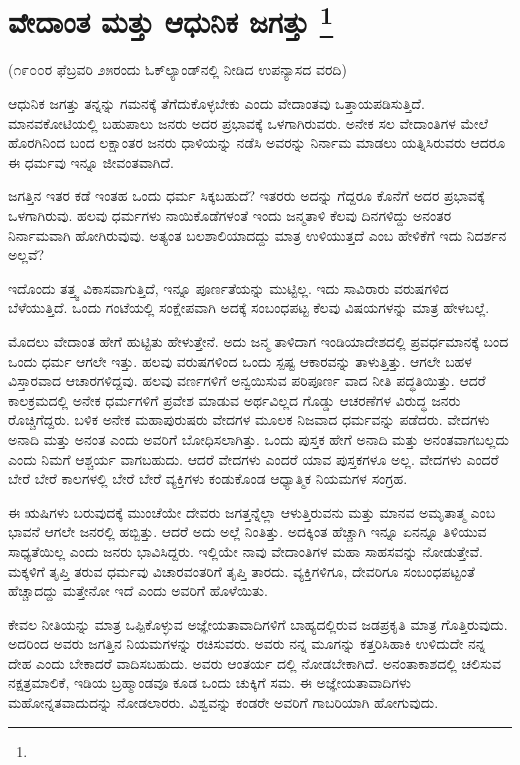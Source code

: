 
\chapter[ವೇದಾಂತ ಮತ್ತು ಆಧುನಿಕ ಜಗತ್ತು ]{ವೇದಾಂತ ಮತ್ತು ಆಧುನಿಕ ಜಗತ್ತು \protect\footnote{}}

\centerline{(೧೯೦೦ರ ಫೆಬ್ರವರಿ ೨೫ರಂದು ಓಕ್​ಲ್ಯಾಂಡ್​ನಲ್ಲಿ ನೀಡಿದ ಉಪನ್ಯಾಸದ ವರದಿ)}

ಆಧುನಿಕ ಜಗತ್ತು ತನ್ನನ್ನು ಗಮನಕ್ಕೆ ತೆಗೆದುಕೊಳ್ಳಬೇಕು ಎಂದು ವೇದಾಂತವು ಒತ್ತಾಯಪಡಿಸುತ್ತಿದೆ. ಮಾನವಕೋಟಿಯಲ್ಲಿ ಬಹುಪಾಲು ಜನರು ಅದರ ಪ್ರಭಾವಕ್ಕೆ ಒಳಗಾಗಿರುವರು. ಅನೇಕ ಸಲ ವೇದಾಂತಿಗಳ ಮೇಲೆ ಹೊರಗಿನಿಂದ ಬಂದ ಲಕ್ಷಾಂತರ ಜನರು ಧಾಳಿಯನ್ನು ನಡೆಸಿ ಅವರನ್ನು ನಿರ್ನಾಮ ಮಾಡಲು ಯತ್ನಿಸಿರುವರು ಆದರೂ ಈ ಧರ್ಮವು ಇನ್ನೂ ಜೀವಂತವಾಗಿದೆ.

ಜಗತ್ತಿನ ಇತರ ಕಡೆ ಇಂತಹ ಒಂದು ಧರ್ಮ ಸಿಕ್ಕಬಹುದೆ? ಇತರರು ಅದನ್ನು ಗೆದ್ದರೂ ಕೊನೆಗೆ ಅದರ ಪ್ರಭಾವಕ್ಕೆ ಒಳಗಾಗಿರುವು. ಹಲವು ಧರ್ಮಗಳು ನಾಯಿಕೊಡೆಗಳಂತೆ ಇಂದು ಜನ್ಮತಾಳಿ ಕೆಲವು ದಿನಗಳಿದ್ದು ಅನಂತರ ನಿರ್ನಾಮವಾಗಿ ಹೋಗಿರುವುವು. ಅತ್ಯಂತ ಬಲಶಾಲಿಯಾದದ್ದು ಮಾತ್ರ ಉಳಿಯುತ್ತದೆ ಎಂಬ ಹೇಳಿಕೆಗೆ ಇದು ನಿದರ್ಶನ ಅಲ್ಲವೆ?

ಇದೊಂದು ತತ್ತ್ವ ವಿಕಾಸವಾಗುತ್ತಿದೆ, ಇನ್ನೂ ಪೂರ್ಣತೆಯನ್ನು ಮುಟ್ಟಿಲ್ಲ. ಇದು ಸಾವಿರಾರು ವರುಷಗಳಿದ ಬೆಳೆಯುತ್ತಿದೆ. ಒಂದು ಗಂಟೆಯಲ್ಲಿ ಸಂಕ್ಷೇಪವಾಗಿ ಅದಕ್ಕೆ ಸಂಬಂಧಪಟ್ಟ ಕೆಲವು ವಿಷಯಗಳನ್ನು ಮಾತ್ರ ಹೇಳಬಲ್ಲೆ.

ಮೊದಲು ವೇದಾಂತ ಹೇಗೆ ಹುಟ್ಟಿತು ಹೇಳುತ್ತೇನೆ. ಅದು ಜನ್ಮ ತಾಳಿದಾಗ ಇಂಡಿಯಾದೇಶದಲ್ಲಿ ಪ್ರವರ್ಧಮಾನಕ್ಕೆ ಬಂದ ಒಂದು ಧರ್ಮ ಆಗಲೇ ಇತ್ತು. ಹಲವು ವರುಷಗಳಿಂದ ಒಂದು ಸ್ಪಷ್ಟ ಆಕಾರವನ್ನು ತಾಳುತ್ತಿತ್ತು. ಆಗಲೇ ಬಹಳ ವಿಸ್ತಾರವಾದ ಆಚಾರಗಳಿದ್ದವು. ಹಲವು ವರ್ಣಗಳಿಗೆ ಅನ್ವಯಿಸುವ ಪರಿಪೂರ್ಣ ವಾದ ನೀತಿ ಪದ್ಧತಿಯಿತ್ತು. ಆದರೆ ಕಾಲಕ್ರಮದಲ್ಲಿ ಅನೇಕ ಧರ್ಮಗಳಿಗೆ ಪ್ರವೇಶ ಮಾಡುವ ಅರ್ಥವಿಲ್ಲದ ಗೊಡ್ಡು ಆಚರಣೆಗಳ ವಿರುದ್ಧ ಜನರು ರೊಚ್ಚಿಗೆದ್ದರು. ಬಳಿಕ ಅನೇಕ ಮಹಾಪುರುಷರು ವೇದಗಳ ಮೂಲಕ ನಿಜವಾದ ಧರ್ಮವನ್ನು ಪಡೆದರು. ವೇದಗಳು ಅನಾದಿ ಮತ್ತು ಅನಂತ ಎಂದು ಅವರಿಗೆ ಬೋಧಿಸಲಾಗಿತ್ತು. ಒಂದು ಪುಸ್ತಕ ಹೇಗೆ ಅನಾದಿ ಮತ್ತು ಅನಂತವಾಗಬಲ್ಲದು ಎಂದು ನಿಮಗೆ ಆಶ್ಚರ್ಯ ವಾಗಬಹುದು. ಆದರೆ ವೇದಗಳು ಎಂದರೆ ಯಾವ ಪುಸ್ತಕಗಳೂ ಅಲ್ಲ. ವೇದಗಳು ಎಂದರೆ ಬೇರೆ ಬೇರೆ ಕಾಲಗಳಲ್ಲಿ ಬೇರೆ ಬೇರೆ ವ್ಯಕ್ತಿಗಳು ಕಂಡುಕೊಂಡ ಆಧ್ಯಾತ್ಮಿಕ ನಿಯಮಗಳ ಸಂಗ್ರಹ.

ಈ ಋಷಿಗಳು ಬರುವುದಕ್ಕೆ ಮುಂಚೆಯೇ ದೇವರು ಜಗತ್ತನ್ನೆಲ್ಲಾ ಆಳುತ್ತಿರುವನು ಮತ್ತು ಮಾನವ ಅಮೃತಾತ್ಮ ಎಂಬ ಭಾವನೆ ಆಗಲೇ ಜನರಲ್ಲಿ ಹಬ್ಬಿತ್ತು. ಆದರೆ ಅದು ಅಲ್ಲೆ ನಿಂತಿತ್ತು. ಅದಕ್ಕಿಂತ ಹೆಚ್ಚಾಗಿ ಇನ್ನೂ ಏನನ್ನೂ ತಿಳಿಯುವ ಸಾಧ್ಯತೆಯಿಲ್ಲ ಎಂದು ಜನರು ಭಾವಿಸಿದ್ದರು. ಇಲ್ಲಿಯೇ ನಾವು ವೇದಾಂತಿಗಳ ಮಹಾ ಸಾಹಸವನ್ನು ನೋಡುತ್ತೇವೆ. ಮಕ್ಕಳಿಗೆ ತೃಪ್ತಿ ತರುವ ಧರ್ಮವು ವಿಚಾರವಂತರಿಗೆ ತೃಪ್ತಿ ತಾರದು. ವ್ಯಕ್ತಿಗಳಿಗೂ, ದೇವರಿಗೂ ಸಂಬಂಧಪಟ್ಟಂತೆ ಹೆಚ್ಚಾದದ್ದು ಮತ್ತೇನೋ ಇದೆ ಎಂದು ಅವರಿಗೆ ಹೊಳೆಯಿತು.

ಕೇವಲ ನೀತಿಯನ್ನು ಮಾತ್ರ ಒಪ್ಪಿಕೊಳ್ಳುವ ಅಜ್ಞೇಯತಾವಾದಿಗಳಿಗೆ ಬಾಹ್ಯದಲ್ಲಿರುವ ಜಡಪ್ರಕೃತಿ ಮಾತ್ರ ಗೊತ್ತಿರುವುದು. ಅದರಿಂದ ಅವರು ಜಗತ್ತಿನ ನಿಯಮಗಳನ್ನು ರಚಿಸುವರು. ಅವರು ನನ್ನ ಮೂಗನ್ನು ಕತ್ತರಿಸಿಹಾಕಿ ಉಳಿದುದೇ ನನ್ನ ದೇಹ ಎಂದು ಬೇಕಾದರೆ ವಾದಿಸಬಹುದು. ಅವರು ಆಂತರ್ಯ ದಲ್ಲಿ ನೋಡಬೇಕಾಗಿದೆ. ಅನಂತಾಕಾಶದಲ್ಲಿ ಚಲಿಸುವ ನಕ್ಷತ್ರಮಾಲಿಕೆ, ಇಡಿಯ ಬ್ರಹ್ಮಾಂಡವೂ ಕೂಡ ಒಂದು ಚುಕ್ಕಿಗೆ ಸಮ. ಈ ಅಜ್ಞೇಯತಾವಾದಿಗಳು ಮಹೋನ್ನತವಾದುದನ್ನು ನೋಡಲಾರರು. ವಿಶ್ವವನ್ನು ಕಂಡರೇ ಅವರಿಗೆ ಗಾಬರಿಯಾಗಿ ಹೋಗುವುದು.

